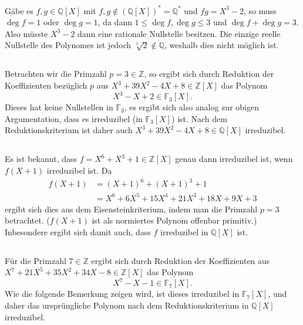 \documentclass[a4paper,10pt]{article}
\theoremstyle{definition}
\newcommand{\Z}{\mathbb{Z}}
\newcommand{\Q}{\mathbb{Q}}
\newcommand{\F}{\mathbb{F}}
\begin{document}
\section{}


\subsection{}
Gäbe es $f,g \in \Q[X]$ mit $f,g \not\in (\Q[X])^* = \Q^*$ und $fg = X^3-2$, so muss $\deg f = 1$ oder $\deg g = 1$, da dann $1 \leq \deg f, \deg g \leq 3$ und $\deg f + \deg g = 3$. Also müsste $X^3-2$ dann eine rationale Nullstelle besitzen. Die einzige reelle Nullstelle des Polynomes ist jedoch $\sqrt[3]{2} \not\in \Q$, weshalb dies nicht möglich ist.


\subsection{}
Betrachten wir die Primzahl $p = 3 \in \Z$, so ergibt sich durch Reduktion der Koeffizienten bezüglich $p$ aus $X^3 +39X^2 -4X +8 \in \Z[X]$ das Polynom
\[
 X^3 -X +2 \in \F_3[X].
\]
Dieses hat keine Nullstellen in $\F_3$, es ergibt sich also analog zur obigen Argumentation, dass es irreduzibel (in $\F_3[X]$) ist. Nach dem Reduktionskriterium ist daher auch $X^3 +39X^2 -4X +8 \in \Q[X]$ irreduzibel.



\subsection{}
Es ist bekannt, dass $f = X^6+X^3+1 \in \Z[X]$ genau dann irreduzibel ist, wenn $f(X+1)$ irreduzibel ist. Da
\begin{align*}
 f(X+1) &= (X+1)^6+(X+1)^3+1 \\
        &= X^6 + 6X^5 + 15X^4 + 21X^3 + 18X + 9X + 3
\end{align*}
ergibt sich dies aus dem Eisensteinkriterium, indem man die Primzahl $p = 3$ betrachtet. ($f(X+1)$ ist als normiertes Polynom offenbar primitiv.) Inbesondere ergibt sich damit auch, dass $f$ irreduzibel in $\Q[X]$ ist.


\subsection{}
Für die Primzahl $7 \in \Z$ ergibt sich durch Reduktion der Koeffizienten aus $X^7 + 21X^5 + 35X^2 +34X -8 \in \Z[X]$ das Polynom
\[
 X^7 -X -1 \in \F_7[X].
\]
Wie die folgende Bemerkung zeigen wird, ist dieses irreduzibel in $\F_7[X]$, und daher das ursprüngliche Polynom nach dem Reduktionskriterium in $\Q[X]$ irreduzibel.
\end{document}
